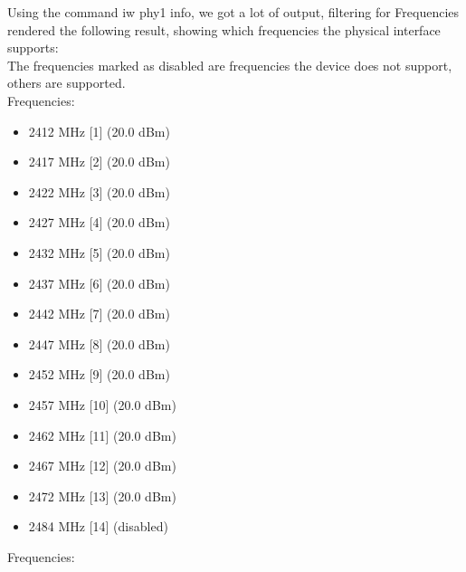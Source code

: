 Using the command iw phy1 info, we got a lot of output, filtering for Frequencies rendered the following result, showing which frequencies the physical interface supports:\\
The frequencies marked as disabled are frequencies the device does not support, others are supported.\\
Frequencies:\\
\begin{itemize}
\item 2412 MHz [1] (20.0 dBm)
\item 2417 MHz [2] (20.0 dBm)
\item 2422 MHz [3] (20.0 dBm)
\item 2427 MHz [4] (20.0 dBm)
\item 2432 MHz [5] (20.0 dBm)
\item 2437 MHz [6] (20.0 dBm)
\item 2442 MHz [7] (20.0 dBm)
\item 2447 MHz [8] (20.0 dBm)
\item 2452 MHz [9] (20.0 dBm)
\item 2457 MHz [10] (20.0 dBm)
\item 2462 MHz [11] (20.0 dBm)
\item 2467 MHz [12] (20.0 dBm)
\item 2472 MHz [13] (20.0 dBm)
\item 2484 MHz [14] (disabled)
\end{itemize}
Frequencies:\\
